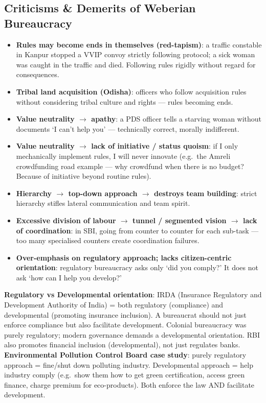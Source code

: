 \subsection*{Criticisms \& Demerits of Weberian Bureaucracy}
\begin{itemize}
\item \textbf{Rules may become ends in themselves (red-tapism)}: a traffic constable in Kanpur stopped a VVIP convoy strictly following protocol; a sick woman was caught in the traffic and died. Following rules rigidly without regard for consequences.
\item \textbf{Tribal land acquisition (Odisha)}: officers who follow acquisition rules without considering tribal culture and rights --- rules becoming ends.
\item \textbf{Value neutrality $\rightarrow$ apathy}: a PDS officer tells a starving woman without documents `I can't help you' --- technically correct, morally indifferent.
\item \textbf{Value neutrality $\rightarrow$ lack of initiative / status quoism}: if I only mechanically implement rules, I will never innovate (e.g.\ the Amreli crowdfunding road example --- why crowdfund when there is no budget? Because of initiative beyond routine rules).
\item \textbf{Hierarchy $\rightarrow$ top-down approach $\rightarrow$ destroys team building}: strict hierarchy stifles lateral communication and team spirit.
\item \textbf{Excessive division of labour $\rightarrow$ tunnel / segmented vision $\rightarrow$ lack of coordination}: in SBI, going from counter to counter for each sub-task --- too many specialised counters create coordination failures.
\item \textbf{Over-emphasis on regulatory approach; lacks citizen-centric orientation}: regulatory bureaucracy asks only `did you comply?' It does not ask `how can I help you develop?'
\end{itemize}

\begin{ComparisonBox}
\textbf{Regulatory vs Developmental orientation}: IRDA (Insurance Regulatory and Development Authority of India) = both regulatory (compliance) and developmental (promoting insurance inclusion). A bureaucrat should not just enforce compliance but also facilitate development. Colonial bureaucracy was purely regulatory; modern governance demands a developmental orientation. RBI also promotes financial inclusion (developmental), not just regulates banks.\\[4pt]
\textbf{Environmental Pollution Control Board case study}: purely regulatory approach = fine/shut down polluting industry. Developmental approach = help industry comply (e.g.\ show them how to get green certification, access green finance, charge premium for eco-products). Both enforce the law AND facilitate development.
\end{ComparisonBox}

